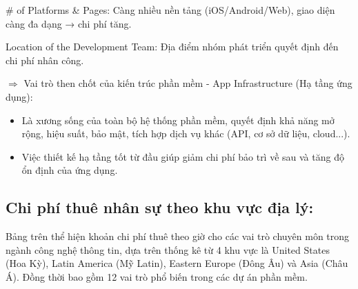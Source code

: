     \begin{flushleft}
      \hspace*{0.8cm}\# of Platforms \& Pages: Càng nhiều nền tảng (iOS/Android/Web), giao diện càng đa dạng → chi phí tăng.
    \end{flushleft}

    \begin{flushleft}
      \hspace*{0.8cm}Location of the Development Team: Địa điểm nhóm phát triển quyết định đến chi phí nhân công.
    \end{flushleft}

    \begin{flushleft}
      \hspace*{0.8cm}$\Rightarrow$ Vai trò then chốt của kiến trúc phần mềm - App Infrastructure (Hạ tầng ứng dụng):
      \setlength{\leftmargini}{1.5cm}
      \begin{itemize}
          \item Là xương sống của toàn bộ hệ thống phần mềm, quyết định khả năng mở rộng, hiệu suất, bảo mật, tích hợp dịch vụ khác (API, cơ sở dữ liệu, cloud...).
          \item Việc thiết kế hạ tầng tốt từ đầu giúp giảm chi phí bảo trì về sau và tăng độ ổn định của ứng dụng.
      \end{itemize}
    \end{flushleft}

    \begin{flushleft}
      \hspace*{0.8cm}
    \end{flushleft}

    \begin{flushleft}
      \hspace*{0.8cm}
    \end{flushleft}

% 
\subsection{Chi phí thuê nhân sự theo khu vực địa lý:}
\renewcommand{\labelitemi}{--}    
    \begin{flushleft}
        \hspace*{0.8cm}Bảng trên thể hiện khoản chi phí thuê theo giờ cho các vai trò chuyên môn trong ngành công nghệ thông tin, dựa trên thống kê từ 4 khu vực là United States (Hoa Kỳ), Latin America (Mỹ Latin), Eastern Europe (Đông Âu) và Asia (Châu Á). Đồng thời bao gồm 12 vai trò phổ biến trong các dự án phần mềm.
    \end{flushleft}

